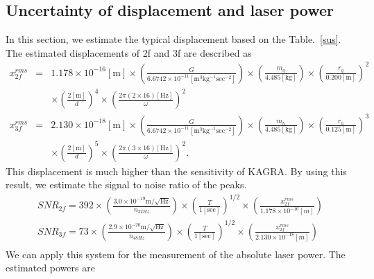 \documentclass[A4]{spie}  %
\begin{document}
\subsection{Uncertainty of displacement and  laser power}
In this section, we estimate the typical displacement based on the Table.~\ref{sus}. 
 The estimated displacements of 2f and 3f are described as
\begin{eqnarray}
x^{rms}_{2f}&=&1.178 \times 10^{-16}\mathrm{[m]} \times \left( \frac{G}{6.6742 \times 10^{-11} \mathrm{[m^3kg^{-1}sec^{-2}]}} \right) \times \left( \frac{m_q}{4.485 \mathrm{[kg]}} \right) \times \left( \frac{r_q}{0.200 \mathrm{[m]}} \right)^2 \nonumber \\
 &&\times \left( \frac{2\mathrm{[m]}}{d} \right)^4 \times \left( \frac{2\pi(2\times 16)\mathrm{[Hz]}}{\omega} \right)^2\\
x^{rms}_{3f}&=&2.130 \times 10^{-18}\mathrm{[m]} \times \left( \frac{G}{6.6742 \times 10^{-11} \mathrm{[m^3kg^{-1}sec^{-2}]}} \right) \times \left( \frac{m_h}{4.485 \mathrm{[kg]}} \right) \times \left( \frac{r_h}{0.125 \mathrm{[m]}} \right)^3 \nonumber \\
 &&\times \left( \frac{2\mathrm{[m]}}{d} \right)^5 \times \left( \frac{2\pi(3\times 16)\mathrm{[Hz]}}{\omega} \right)^2.
\end{eqnarray}
This displacement is much higher than the sensitivity of KAGRA. 
By using this result, we estimate the signal to noise ratio of the peaks.
\begin{eqnarray}
SNR_{2f}=392 \times \left(\frac{3.0 \times 10^{-19} \mathrm{m/\sqrt{Hz}}}{n_{32Hz}} \right) \times \left(\frac{T}{1 [\mathrm{sec}]} \right)^{1/2} \times \left(\frac{x_{2f}^{rms}}{1.178 \times 10^{-16}[m] }  \right)   \\
SNR_{3f}=73 \times \left(\frac{2.9 \times 10^{-20} \mathrm{m/\sqrt{Hz}}}{n_{48Hz}} \right) \times \left(\frac{T}{1 [\mathrm{sec}]} \right)^{1/2} \times \left(\frac{x_{2f}^{rms}}{2.130 \times 10^{-18}[m] } \right)   \\
\end{eqnarray}
We can apply this system for the measurement of the absolute laser power. The estimated powers are
\end{document}
